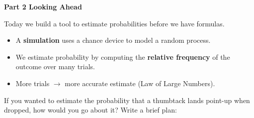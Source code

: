 \documentclass[10pt]{article}
\begin{document}
\vspace{0.35in}

{\large\bfseries\color{navy} Part 2 \quad Looking Ahead}

\vspace{0.12in}

\noindent Today we build a tool to estimate probabilities before we have formulas.

\vspace{0.14in}

\begin{tcolorbox}[colback=greenbg, colframe=greenacc, boxrule=0.8pt, arc=2mm,
    left=4mm, right=4mm, top=3mm, bottom=3mm]
    \small
    \begin{itemize}[leftmargin=1.3em, itemsep=8pt]
  \item A \textbf{simulation} uses a chance device to model a random process.
  \item We estimate probability by computing the \textbf{relative frequency} of the outcome over many trials.
  \item More trials $\to$ more accurate estimate (Law of Large Numbers).
    \end{itemize}
\end{tcolorbox}

\vspace{0.2in}

\noindent\textcolor{slate}{\small If you wanted to estimate the probability that a thumbtack
lands point-up when dropped, how would you go about it? Write a brief plan:}\\[8pt]
\writeline\\[2pt]\writeline
\end{document}
